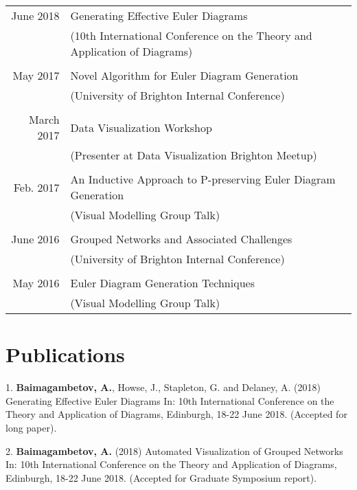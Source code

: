 \documentclass[a4paper,11pt]{article} %
\begin{document}
\begin{center}
\begin{tabular}{rl}
June 2018 & Generating Effective Euler Diagrams\\ & (10th International Conference on the Theory and Application of Diagrams) \\
\\
May 2017 & Novel Algorithm for Euler Diagram Generation\\ & (University of Brighton Internal Conference) \\
\\
March 2017 & Data Visualization Workshop\\ & (Presenter at Data Visualization Brighton Meetup) \\
\\
Feb. 2017 & An Inductive Approach to P-preserving Euler Diagram Generation\\ & (Visual Modelling Group Talk) \\
\\
June 2016 & Grouped Networks and Associated Challenges\\ & (University of Brighton Internal Conference) \\
\\
May 2016 & Euler Diagram Generation Techniques\\ & (Visual Modelling Group Talk) \\
\end{tabular}
\end{center}



\section{Publications}

1. \textbf{Baimagambetov, A.}, Howse, J., Stapleton, G. and Delaney, A. (2018)
Generating Effective Euler Diagrams In:
10th International Conference on the Theory and Application of Diagrams, Edinburgh, 18-22 June 2018.
(Accepted for long paper).

2. \textbf{Baimagambetov, A.} (2018)
Automated Visualization of Grouped Networks In:
10th International Conference on the Theory and Application of Diagrams, Edinburgh, 18-22 June 2018.
(Accepted for Graduate Symposium report).
\end{document}
